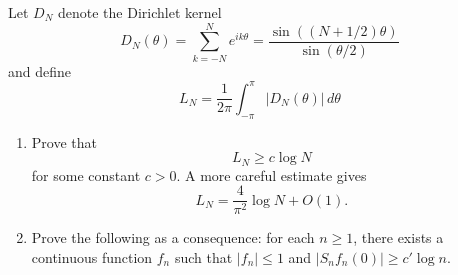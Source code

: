\documentclass[12 pt, letterpaper]{hmcpset}
\begin{document}
\begin{problem}[S \& S \S 2.7 \#2.]
	Let $D_{N}$ denote the Dirichlet kernel
	\[
		D_{N}(\theta) = \sum_{k = -N}^{N} e^{i k \theta} = \frac{\sin{((N + 1/2) \theta)}}{\sin{(\theta / 2)}}
	\]
	and define
	\[
		L_{N} = \frac{1}{2 \pi} \int_{-\pi}^{\pi} \lvert D_{N}(\theta) \rvert \, d \theta
	\]
	\begin{enumerate}
		\item Prove that
			\[
				L_{N} \ge c \log N
			\]
			for some constant $c > 0$. A more careful estimate gives
			\[
				L_{N} = \frac{4}{\pi^{2}} \log N + O(1).
			\]
		\item Prove the following as a consequence: for each $n \ge 1$, there exists a continuous function $f_{n}$ such that $\lvert f_{n} \rvert \le 1$ and $\lvert S_{n}f_{n}(0) \rvert \ge c' \log n$.
	\end{enumerate}
\end{problem}
\end{document}
